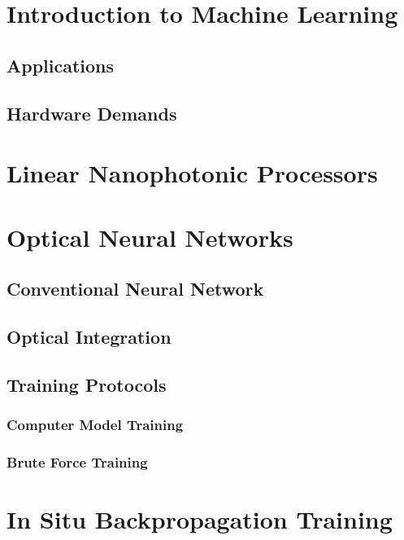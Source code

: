 \section{Introduction to Machine Learning}

\subsection{Applications}

\subsection{Hardware Demands}

\section{Linear Nanophotonic Processors}

\section{Optical Neural Networks}

\subsection{Conventional Neural Network}

\subsection{Optical Integration}

\subsection{Training Protocols}

\subsubsection{Computer Model Training}

\subsubsection{Brute Force Training}

\section{In Situ Backpropagation Training}

